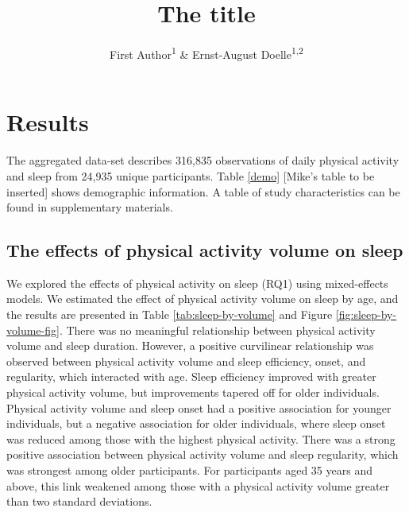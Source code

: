 \documentclass[
  man]{apa6}
\title{The title}
\author{First Author\textsuperscript{1} \& Ernst-August Doelle\textsuperscript{1,2}}
\date{}
\affiliation{\vspace{0.5cm}\textsuperscript{1} Wilhelm-Wundt-University\\\textsuperscript{2} Konstanz Business School}
\begin{document}
\maketitle

\hypertarget{results}{%
\section{Results}\label{results}}

The aggregated data-set describes 316,835 observations of daily physical activity and sleep from 24,935 unique participants. Table \ref{demo} {[}Mike's table to be inserted{]} shows demographic information. A table of study characteristics can be found in supplementary materials.

\hypertarget{the-effects-of-physical-activity-volume-on-sleep}{%
\subsection{The effects of physical activity volume on sleep}\label{the-effects-of-physical-activity-volume-on-sleep}}

We explored the effects of physical activity on sleep (RQ1) using mixed-effects models. We estimated the effect of physical activity volume on sleep by age, and the results are presented in Table \ref{tab:sleep-by-volume} and Figure \ref{fig:sleep-by-volume-fig}. There was no meaningful relationship between physical activity volume and sleep duration. However, a positive curvilinear relationship was observed between physical activity volume and sleep efficiency, onset, and regularity, which interacted with age. Sleep efficiency improved with greater physical activity volume, but improvements tapered off for older individuals. Physical activity volume and sleep onset had a positive association for younger individuals, but a negative association for older individuals, where sleep onset was reduced among those with the highest physical activity. There was a strong positive association between physical activity volume and sleep regularity, which was strongest among older participants. For participants aged 35 years and above, this link weakened among those with a physical activity volume greater than two standard deviations.

\renewcommand{\arraystretch}{0.7}
\end{document}
